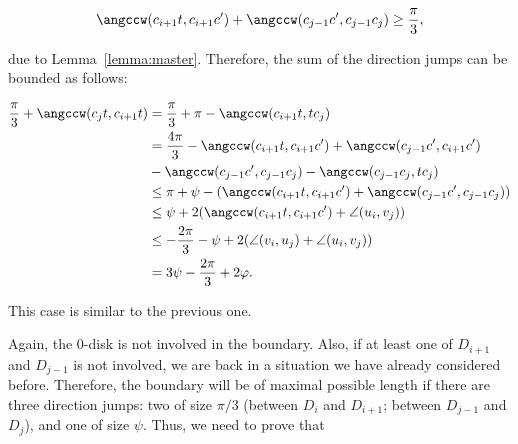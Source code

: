 \begin{enumerate}[label={\bf Case \arabic*: }, wide, labelwidth=!, labelindent=0pt]
$$\angccw(c_{i+1}t, c_{i+1}c') + \angccw(c_{j-1}c', c_{j-1}c_j)\geq\frac{\pi}{3},$$

due to Lemma~\ref{lemma:master}. Therefore, the sum of the direction jumps can be bounded as follows:

\begin{align*}
\frac{\pi}{3} + \angccw(c_jt, c_{i+1}t) & = \frac{\pi}{3} + \pi - \angccw(c_{i+1}t, tc_j) \\
& = \frac{4\pi}{3} - \angccw(c_{i+1}t, c_{i+1}c') + \angccw(c_{j-1}c', c_{i+1}c') \\ & - \angccw(c_{j-1}c', c_{j-1}c_j) - \angccw(c_{j-1}c_j, tc_j) \\
& \leq \pi + \psi - (\angccw(c_{i+1}t, c_{i+1}c') + \angccw(c_{j-1}c', c_{j-1}c_j)) \\
& \leq \psi + 2(\angccw(c_{i+1}t, c_{i+1}c') + \angle(u_i, v_j)) \\
& \leq -\frac{2\pi}{3} - \psi + 2(\angle(v_i, u_j) + \angle(u_i, v_j)) \\
& = 3\psi - \frac{2\pi}{3} + 2\varphi.
\end{align*}


This case is similar to the previous one.



Again, the $0$-disk is not involved in the boundary. Also, if at least one of $D_{i+1}$ and $D_{j-1}$ is not involved, we are back in a situation we have already considered before. Therefore, the boundary will be of maximal possible length if there are three direction jumps: two of size $\pi/3$ (between $D_i$ and $D_{i+1}$; between $D_{j-1}$ and $D_j$), and one of size $\psi$. Thus, we need to prove that


\end{enumerate}
